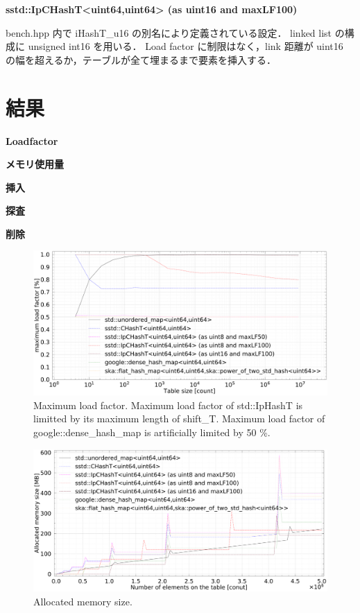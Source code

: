 {\bf sstd::IpCHashT<uint64,uint64> (as uint16 and maxLF100)}

{\rm bench.hpp} 内で {\rm iHashT\_u16} の別名により定義されている設定．
linked list の構成に unsigned int16 を用いる．
Load factor に制限はなく，link 距離が uint16 の幅を超えるか，テーブルが全て埋まるまで要素を挿入する．
\leavevmode \newline



\section{結果}

{\bf Loadfactor}

{\bf メモリ使用量}

{\bf 挿入}

{\bf 探査}

{\bf 削除}

\begin{figure}[h]
  \includegraphics[scale=0.24]{./fig_bench/maxLoadFactor_med.pdf}
  \caption{
    Maximum load factor. Maximum load factor of std::IpHashT is limitted by its maximum length of shift\_T.
    Maximum load factor of google::dense\_hash\_map is artificially limited by 50 \%.
  }
  \label{fig_bench_LF}
\end{figure}

\begin{figure}[h]
  \hspace{-1mm}
  \includegraphics[scale=0.24]{./fig_bench/usedMemory.pdf}
  \caption{ Allocated memory size. }
  \label{fig_bench_memory}
\end{figure}

